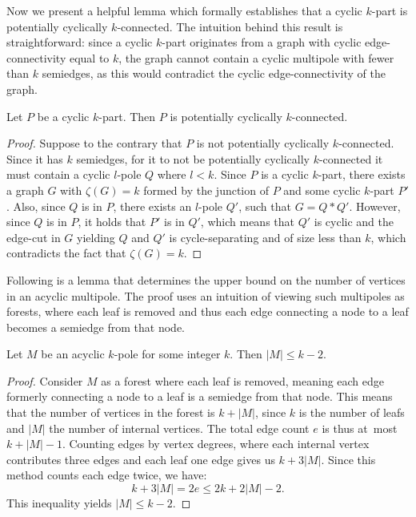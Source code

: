 \documentclass[12pt, twoside]{book}
\begin{document}
Now we present a helpful lemma which formally establishes that a cyclic $k$-part is potentially cyclically $k$-connected. The intuition behind this result is straightforward: since a cyclic $k$-part originates from a graph with cyclic edge-connectivity equal to $k$, the graph cannot contain a cyclic multipole with fewer than $k$ semiedges, as this would contradict the cyclic edge-connectivity of the graph.

\begin{lemma}\label{lem:cyclic-part-no-small-cyclic-l-pole}
	Let $P$ be a cyclic $k$-part. Then $P$ is potentially cyclically $k$-connected.
\end{lemma}

\begin{proof}
	Suppose to the contrary that $P$ is not potentially cyclically $k$-connected. Since it has $k$ semiedges, for it to not be potentially cyclically $k$-connected it must contain a cyclic $l$-pole $Q$ where $l<k$. Since $P$ is a cyclic $k$-part, there exists a graph $G$ with $\zeta(G)=k$ formed by the junction of $P$ and some cyclic $k$-part $P'$. Also, since $Q$ is in $P$, there exists an $l$-pole $Q'$, such that $G=Q*Q'$. However, since $Q$ is in $P$, it holds that $P'$ is in $Q'$, which means that $Q'$ is cyclic and the edge-cut in $G$ yielding $Q$ and $Q'$ is cycle-separating and of size less than $k$, which contradicts the fact that $\zeta(G)=k$.
\end{proof}


Following is a lemma that determines the upper bound on the number of vertices in an acyclic multipole. The proof uses an intuition of viewing such multipoles as forests, where each leaf is removed and thus each edge connecting a node to a leaf becomes a semiedge from that node.

\begin{lemma}\label{lem:number-of-vertices-in-acyclic-k-pole}
	Let $M$ be an acyclic $k$-pole for some integer $k$. Then $|M|\leq k-2$. 
\end{lemma}

\begin{proof}
	Consider $M$ as a forest where each leaf is removed, meaning each edge formerly connecting a node to a leaf is a semiedge from that node. This means that the number of vertices in the forest is $k+|M|$, since $k$ is the number of leafs and $|M|$ the number of internal vertices. The total edge count $e$ is thus at~most $k+|M|-1$. Counting edges by vertex degrees, where each internal vertex contributes three edges and each leaf one edge gives us $k+3|M|$. Since this method counts each edge twice, we have:
	$$k+3|M|=2e\leq 2k+2|M|-2.$$
	This inequality yields $|M|\leq k-2$.
\end{proof}
\end{document}
